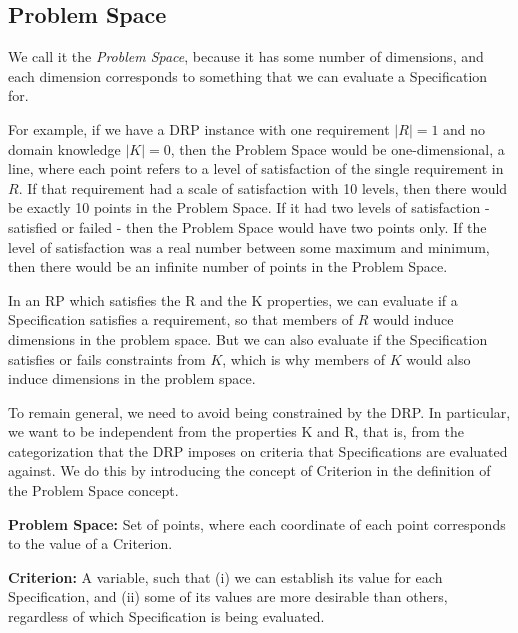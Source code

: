 \documentclass[graybox]{svmult}
\newcommand{\zi}[1]{\textit{#1}}
\newcommand{\xb}[1]{\textbf{#1}}
\newcommand{\xf}[1]{\textsf{#1}}
\newcommand{\RP}{RP}
\newcommand{\ZJRP}{DRP}
\newcommand{\ProblemSpace}{Problem Space}
\newcommand{\Specification}{Specification}
\newcommand{\Criterion}{Criterion}
\newcommand{\PrR}{\xf{R}}
\newcommand{\PrK}{\xf{K}}
\begin{document}
%
\subsection{\ProblemSpace}\label{s:spaces:problem-space}
We call it the \zi{\ProblemSpace}, because it has some number of dimensions, and each dimension corresponds to something that we can evaluate a \Specification{} for. 

For example, if we have a \ZJRP{} instance with one requirement $|R| = 1$ and no domain knowledge $|K| = 0$, then the \ProblemSpace{} would be one-dimensional, a line, where each point refers to a level of satisfaction of the single requirement in $R$. If that requirement had a scale of satisfaction with 10 levels, then there would be exactly 10 points in the \ProblemSpace. If it had two levels of satisfaction - satisfied or failed - then the \ProblemSpace{} would have two points only. If the level of satisfaction was a real number between some maximum and minimum, then there would be an infinite number of points in the \ProblemSpace.

In an \RP{} which satisfies the \PrR{} and the \PrK{} properties, we can evaluate if a Specification satisfies a requirement, so that members of $R$ would induce dimensions in the problem space. But we can also evaluate if the \Specification{} satisfies or fails constraints from $K$, which is why members of $K$ would also induce dimensions in the problem space.

To remain general, we need to avoid being constrained by the \ZJRP. In particular, we want to be independent from the properties \PrK{} and \PrR, that is, from the categorization that the \ZJRP{} imposes on criteria that \Specification s are evaluated against. We do this by introducing the concept of \Criterion{} in the definition of the \ProblemSpace{} concept.

\begin{definition}\label{d:problem-space}
\xb{\ProblemSpace:} Set of points, where each coordinate of each point corresponds to the value of a \Criterion.
\end{definition}

\begin{definition}\label{d:criterion}
\xb{\Criterion:} A variable, such that (i) we can establish its value for each \Specification, and (ii) some of its values are more desirable than others, regardless of which \Specification{} is being evaluated.
\end{definition}
\end{document}
